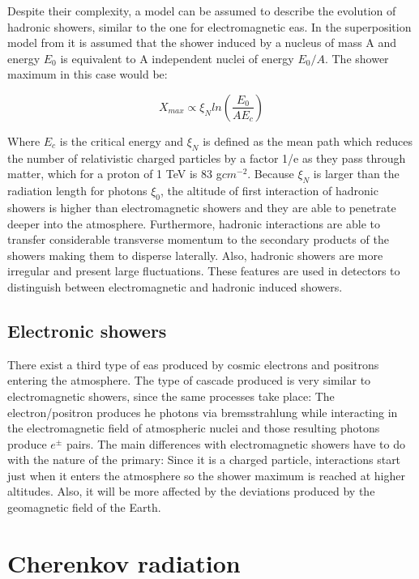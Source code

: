 \documentclass[main.tex]{subfiles}
\begin{document}
Despite their complexity, a model can be assumed to describe the evolution of hadronic showers, similar to the one for electromagnetic \gls{eas}. In the superposition model from \cite{2016GaisserCRandParticlePhy} it is assumed that the shower induced by a nucleus of mass A and energy $E_0$ is equivalent to A independent nuclei of energy $E_0/A$. The shower maximum in this case would be:

\begin{equation}
    X_{max} \propto \xi_{N} ln \left( \frac{E_0}{AE_c}\right)
\end{equation}

Where $E_c$ is the critical energy and $\xi_{N}$ is defined as the mean path which reduces the number of relativistic charged  particles by a factor 1/e as they pass through matter, which for a proton of 1 TeV is 83 g$cm^{-2}$. Because $\xi_{N}$ is larger than the radiation length for photons $\xi_{0}$, the altitude of first interaction of hadronic showers is higher than electromagnetic showers and they are able to penetrate deeper into the atmosphere. 
Furthermore, hadronic interactions are able to transfer considerable transverse momentum to the secondary products of the showers making them to disperse laterally. Also, hadronic showers are more irregular and present large fluctuations. These features are used in detectors to distinguish between electromagnetic and hadronic induced showers.

\subsection{Electronic showers} \label{sec:electroshowers}

There exist a third type of \gls{eas} produced by cosmic electrons and positrons entering the atmosphere. The type of cascade produced is very similar to electromagnetic showers, since the same processes take place: The electron/positron produces \gls{he} photons via bremsstrahlung while interacting in the electromagnetic field of atmospheric nuclei and those resulting photons produce $e^{\pm}$ pairs. The main differences with electromagnetic showers have to do with the nature of the primary: Since it is a charged particle, interactions start just when it enters the atmosphere so the shower maximum is reached at higher altitudes. Also, it will be more affected by the deviations produced by the geomagnetic field of the Earth.  

\section{Cherenkov radiation}\label{sec:cherenkov}
\end{document}
